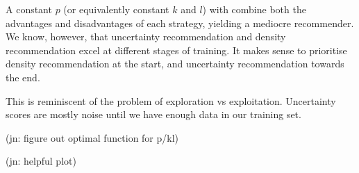 \documentclass[11pt,twoside]{report}
\newcommand\jn[1]{{\color{red}(jn: #1)}}
\begin{document}
A constant $p$ (or equivalently constant $k$ and $l$) with combine both the advantages and disadvantages of each strategy, yielding a mediocre recommender. We know, however, that uncertainty recommendation and density recommendation excel at different stages of training. It makes sense to prioritise density recommendation at the start, and uncertainty recommendation towards the end.

This is reminiscent of the problem of exploration vs exploitation. Uncertainty scores are mostly noise until we have enough data in our training set.

\jn{figure out optimal function for p/kl}

\jn{helpful plot}

{}

\end{document}
